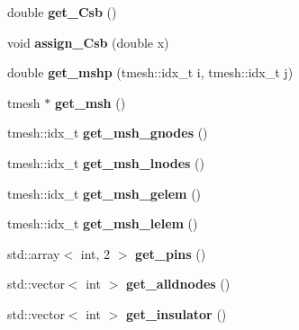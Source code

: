 \begin{DoxyCompactItemize}
\item 
\hypertarget{classDevice_a2d62c2f8a55bd842ff0ab12dbeb51066}{double {\bfseries get\-\_\-\-Csb} ()}\label{classDevice_a2d62c2f8a55bd842ff0ab12dbeb51066}

\item 
\hypertarget{classDevice_a8a9b72a68d97fea5887e38cfb5e10f90}{void {\bfseries assign\-\_\-\-Csb} (double x)}\label{classDevice_a8a9b72a68d97fea5887e38cfb5e10f90}

\item 
\hypertarget{classDevice_a0e48948ca9b6758e8ecb05205c04f1b0}{double {\bfseries get\-\_\-mshp} (tmesh\-::idx\-\_\-t i, tmesh\-::idx\-\_\-t j)}\label{classDevice_a0e48948ca9b6758e8ecb05205c04f1b0}

\item 
\hypertarget{classDevice_a40dc275da1aa2ef9c9d1ea5560bef1df}{tmesh $\ast$ {\bfseries get\-\_\-msh} ()}\label{classDevice_a40dc275da1aa2ef9c9d1ea5560bef1df}

\item 
\hypertarget{classDevice_ab73d4f02515b3c563245271b1dcb8dc9}{tmesh\-::idx\-\_\-t {\bfseries get\-\_\-msh\-\_\-gnodes} ()}\label{classDevice_ab73d4f02515b3c563245271b1dcb8dc9}

\item 
\hypertarget{classDevice_a84bdce12b25f9f4a489f78f16e318d05}{tmesh\-::idx\-\_\-t {\bfseries get\-\_\-msh\-\_\-lnodes} ()}\label{classDevice_a84bdce12b25f9f4a489f78f16e318d05}

\item 
\hypertarget{classDevice_a8a537951ab44c20eafc8c9e233b4487d}{tmesh\-::idx\-\_\-t {\bfseries get\-\_\-msh\-\_\-gelem} ()}\label{classDevice_a8a537951ab44c20eafc8c9e233b4487d}

\item 
\hypertarget{classDevice_a5e5b8de9efed7ff399f317f9c337bde1}{tmesh\-::idx\-\_\-t {\bfseries get\-\_\-msh\-\_\-lelem} ()}\label{classDevice_a5e5b8de9efed7ff399f317f9c337bde1}

\item 
\hypertarget{classDevice_a98ecaa9e3d37ad6467f8a4be294efc2f}{std\-::array$<$ int, 2 $>$ {\bfseries get\-\_\-pins} ()}\label{classDevice_a98ecaa9e3d37ad6467f8a4be294efc2f}

\item 
\hypertarget{classDevice_afb5c3ebb43ef7f4862af318eaf36821a}{std\-::vector$<$ int $>$ {\bfseries get\-\_\-alldnodes} ()}\label{classDevice_afb5c3ebb43ef7f4862af318eaf36821a}

\item 
\hypertarget{classDevice_a42f17886f6a57dae5152a40648c3a125}{std\-::vector$<$ int $>$ {\bfseries get\-\_\-insulator} ()}\label{classDevice_a42f17886f6a57dae5152a40648c3a125}


\end{DoxyCompactItemize}
